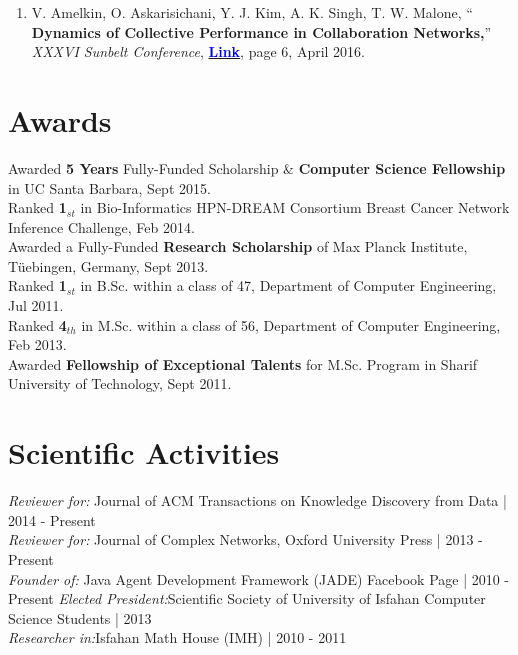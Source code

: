 \documentclass[letter]{res}
\begin{document}
\begin{resume}
\begin{enumerate}[leftmargin=-.01in]
			\item V. Amelkin, O. Askarisichani, Y. J. Kim, A. K. Singh, T. W. Malone, `` \textbf{Dynamics of Collective Performance in Collaboration Networks,}'' \textit{XXXVI Sunbelt Conference}, \href{http://insna.org/sunbelt2016/wp-content/uploads/2015/09/Sunbelt2016abstracts.pdf}{\textbf{\textcolor{blue}{Link}}}, page 6, April 2016.
			
		\end{enumerate}
		
		
		\section{Awards}
		Awarded \textbf{5 Years} Fully-Funded Scholarship \& \textbf{Computer Science Fellowship} in UC Santa Barbara, Sept 2015.\\
		Ranked \textbf{1}$_{st}$ in Bio-Informatics HPN-DREAM Consortium Breast Cancer Network Inference Challenge, Feb 2014.\\
		Awarded a Fully-Funded \textbf{Research Scholarship} of Max Planck Institute, Tüebingen, Germany, Sept 2013.\\
		Ranked \textbf{1}$_{st}$ in B.Sc. within a class of 47, Department of Computer Engineering, Jul 2011.\\
		Ranked \textbf{4}$_{th}$ in M.Sc. within a class of 56, Department of Computer Engineering, Feb 2013.\\
		Awarded \textbf{Fellowship of Exceptional Talents} for M.Sc. Program in Sharif University of Technology, Sept 2011.
		
		
		\section{Scientific Activities}
		{\sl Reviewer for:  }Journal of ACM Transactions on Knowledge Discovery from Data | 2014 - Present\\
		{\sl Reviewer for:  }Journal of Complex Networks, Oxford University Press | 2013 - Present\\
		{\sl Founder of:  }Java Agent Development Framework (JADE) Facebook Page | 2010 - Present
		{\sl Elected President:}Scientific Society of University of Isfahan Computer Science Students | 2013\\
		{\sl Researcher in:}Isfahan Math House (IMH) | 2010 - 2011
		

\end{resume}
\end{document}
